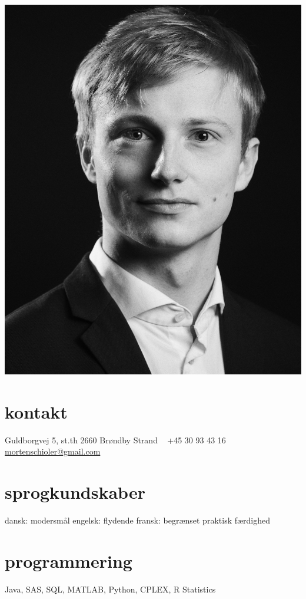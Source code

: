 \documentclass[]{../friggeri-cv} %
\begin{document}


\begin{aside} %
\includegraphics[width=\linewidth]{../graphics/pic8x10.jpg}
\section{kontakt}
Guldborgvej 5, st.th
2660 Brøndby Strand
~
+45 30 93 43 16
{\small \href{mailto:mortenschioler@gmail.com}{mortenschioler@gmail.com}}
\section{sprogkundskaber}
	dansk:  \quad modersmål
	engelsk: \quad flydende
	fransk: \quad begrænset praktisk færdighed
\section{programmering}
Java, SAS, SQL,
\textsc{MATLAB}, Python, CPLEX,
R Statistics
\end{aside}
\end{document}
